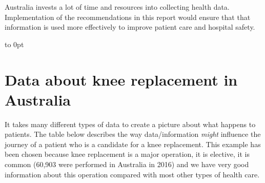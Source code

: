 \documentclass[FrontPage]{grattan}
\begin{document}
Australia invests a lot of time and resources into collecting health data. Implementation of the recommendations in this report would ensure that that information is used more effectively to improve patient care and hospital safety.

\appendix

\onecolumn
\onecolumn\vtop to 0pt\bgroup\vspace{-24.5pt}\chapter{Data about knee replacement in Australia}\label{chap:knee}\egroup\vspace{\baselineskip}
It takes many different types of data to create a picture about what happens to patients. The table below describes the way data/information \textit{might} influence the journey of a patient who is a candidate for a knee replacement. This example has been chosen because knee replacement is a major operation, it is elective, it is common (60,903 were performed in Australia in 2016) and we have very good information about this operation compared with most other types of health care.

\vspace{-10pt}
\bgroup
\def\arraystretch{1.25}
\end{document}
